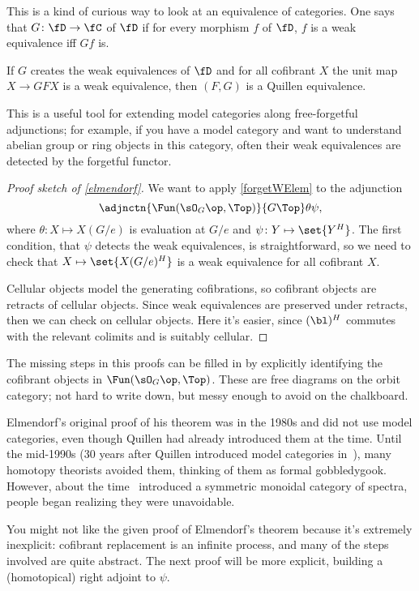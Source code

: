 This is a kind of curious way to look at an equivalence of categories. One says that $G\colon \fD\to\fC$
 of $\fD$ if for every morphism $f$ of $\fD$,
$f$ is a weak equivalence iff $Gf$ is.
\begin{lem}
\label{forgetWElem}
If $G$ creates the weak equivalences of $\fD$ and for all cofibrant $X$ the unit map $X\to GFX$ is a weak
equivalence, then $(F,G)$ is a Quillen equivalence.
\end{lem}
This is a useful tool for extending model categories along free-forgetful adjunctions; for example, if you have a
model category and want to understand abelian group or ring objects in this category, often their weak equivalences
are detected by the forgetful functor.
\begin{proof}[Proof sketch of \cref{elmendorf}]
We want to apply \cref{forgetWElem} to the adjunction
\[ \adjnctn {\Fun(\sO_G\op, \Top)}{G\Top}\theta\psi,\]
where $\theta\colon X\mapsto X(G/e)$ is evaluation at $G/e$ and $\psi\colon Y\mapsto\set{Y^H}$. The first
condition, that $\psi$ detects the weak equivalences, is straightforward, so we need to check that
$X\mapsto\set{X(G/e)^H}$ is a weak equivalence for all cofibrant $X$.

Cellular objects model the generating cofibrations, so cofibrant objects are retracts of cellular objects. Since
weak equivalences are preserved under retracts, then we can check on cellular objects. Here it's easier, since
$(\bl)^H$ commutes with the relevant colimits and is suitably cellular.
\end{proof}
The missing steps in this proofs can be filled in by explicitly identifying the cofibrant objects in
$\Fun(\sO_G\op, \Top)$. These are free diagrams on the orbit category; not hard to write down, but messy enough to
avoid on the chalkboard.
\begin{rem}
Elmendorf's original proof of his theorem was in the 1980s and did not use model categories, even though Quillen
had already introduced them at the time. Until the mid-1990s (30 years after Quillen introduced model categories
in~\cite{QuillenHA}), many homotopy theorists avoided them, thinking of them as formal gobbledygook. However, about
the time~\cite{EKMM} introduced a symmetric monoidal category of spectra, people began realizing they were
unavoidable.
\end{rem}
You might not like the given proof of Elmendorf's theorem because it's extremely inexplicit: cofibrant replacement
is an infinite process, and many of the steps involved are quite abstract. The next proof will be more explicit,
building a (homotopical) right adjoint to $\psi$.

